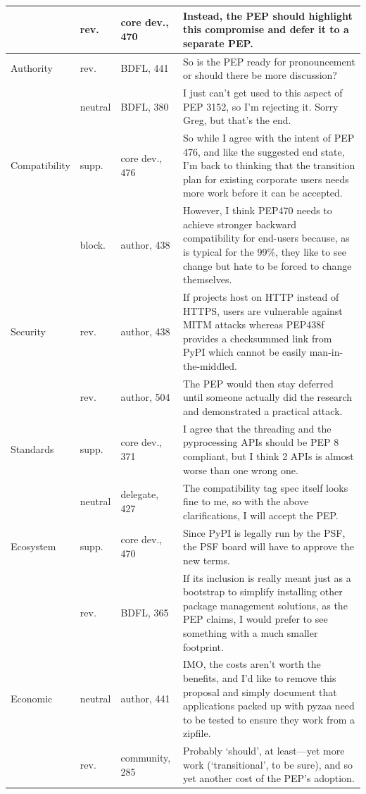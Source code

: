 \documentclass[sigconf,screen]{acmart}
\begin{document}
\begin{table}
\begin{tabular}{p{}p{}p{}p{}}
 & rev. & core dev., 470 & Instead, the PEP should highlight this compromise and defer it to a separate PEP. \\
\midrule
Authority & rev. & BDFL, 441 & So is the PEP ready for pronouncement or should there be more discussion? \\
 & neutral & BDFL, 380 & I just can't get used to this aspect of PEP 3152, so I'm rejecting it. Sorry Greg, but that's the end. \\
\midrule
Compatibility & supp. & core dev., 476 & So while I agree with the intent of PEP 476, and like the suggested end state, I'm back to thinking that the transition plan for existing corporate users needs more work before it can be accepted. \\
 & block. & author, 438 & However, I think PEP470 needs to achieve stronger backward compatibility for end-users because, as is typical for the 99\%, they like to see change but hate to be forced to change themselves. \\
\midrule
Security & rev. & author, 438 & If projects host on HTTP instead of HTTPS, users are vulnerable against MITM attacks whereas PEP438f provides a checksummed link from PyPI which cannot be easily man-in-the-middled. \\
 & rev. & author, 504 & The PEP would then stay deferred until someone actually did the research and demonstrated a practical attack. \\
\midrule
Standards & supp. & core dev., 371 & I agree that the threading and the pyprocessing APIs should be PEP 8 compliant, but I think 2 APIs is almost worse than one wrong one. \\
 & neutral & delegate, 427 & The compatibility tag spec itself looks fine to me, so with the above clarifications, I will accept the PEP. \\
\midrule
Ecosystem & supp. & core dev., 470 & Since PyPI is legally run by the PSF, the PSF board will have to approve the new terms. \\
 & rev. & BDFL, 365 & If its inclusion is really meant just as a bootstrap to simplify installing other package management solutions, as the PEP claims, I would prefer to see something with a much smaller footprint. \\
\midrule
Economic & neutral & author, 441 & IMO, the costs aren't worth the benefits, and I'd like to remove this proposal and simply document that applications packed up with pyzaa need to be tested to ensure they work from a zipfile. \\
 & rev. & community, 285 & Probably `should', at least---yet more work (`transitional', to be sure), and so yet another cost of the PEP's adoption. \\

\end{tabular}
\end{table}
\end{document}
